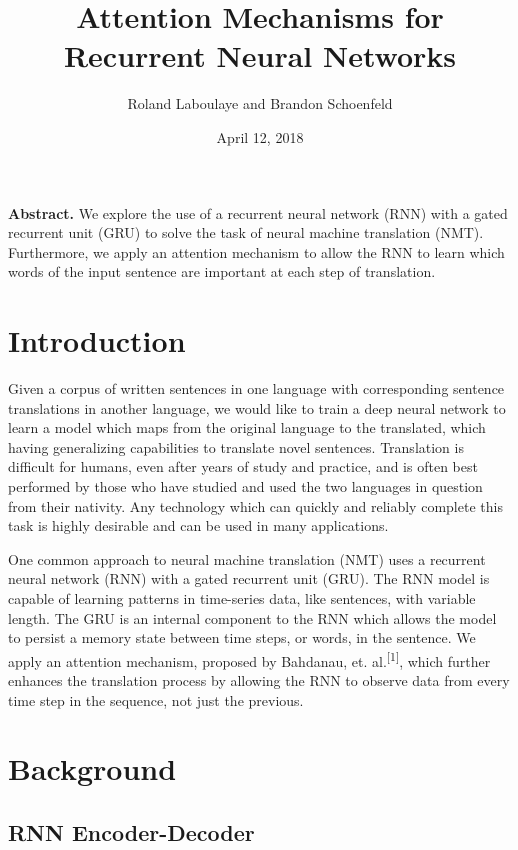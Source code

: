 \documentclass[letterpaper, 10pt]{article}
\begin{document}
\title{Attention Mechanisms for Recurrent Neural Networks}
\author{Roland Laboulaye and Brandon Schoenfeld}
\date{April 12, 2018}
\maketitle

\begin{multicols}{2}

\noindent \textbf{Abstract.}
We explore the use of a recurrent neural network (RNN) with a gated recurrent unit (GRU) to solve
the task of neural machine translation (NMT). Furthermore, we apply an attention mechanism to allow
the RNN to learn which words of the input sentence are important at each step of translation.

\section{Introduction}
Given a corpus of written sentences in one language with corresponding sentence translations in
another language, we would like to train a deep neural network to learn a model which maps from the
original language to the translated, which having generalizing capabilities to translate novel
sentences.
Translation is difficult for humans, even after years of study and practice, and is often best
performed by those who have studied and used the two languages in question from their nativity.
Any technology which can quickly and reliably complete this task is highly desirable and can be used
in many applications.

One common approach to neural machine translation (NMT) uses a recurrent neural network (RNN) with
a gated recurrent unit (GRU).
The RNN model is capable of learning patterns in time-series data,
like sentences, with variable length.
The GRU is an internal component to the RNN which allows the model to persist a memory state between
time steps, or words, in the sentence.
We apply an attention mechanism, proposed by Bahdanau, et. al.\textsuperscript{[1]}, which further
enhances the translation process by allowing the RNN to observe data from every time step in the
sequence, not just the previous.

\section{Background}
\subsection{RNN Encoder-Decoder}


\end{multicols}
\end{document}
